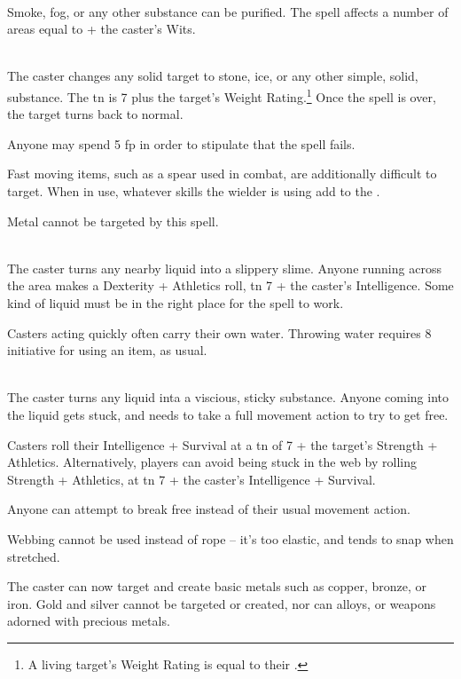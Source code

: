 \documentclass[titlepage,a4paper,openany]{book}
\begin{document}
\begin{multicols}{2}
\\
Smoke, fog, or any other substance can be purified.  The spell affects a number of areas equal to  + the caster's Wits.

\\
The caster changes any solid target to stone, ice, or any other simple, solid, substance.  The \gls{tn} is 7 plus the target's Weight Rating.\footnote{A living target's Weight Rating is equal to their .}  Once the spell is over, the target turns back to normal.

Anyone may spend 5 \gls{fp} in order to stipulate that the spell fails.

Fast moving items, such as a spear used in combat, are additionally difficult to target.  When in use, whatever skills the wielder is using add to the .

Metal cannot be targeted by this spell.

\\
The caster turns any nearby liquid into a slippery slime.  Anyone running across the area makes a Dexterity + Athletics roll, \gls{tn} 7 + the caster's Intelligence.  Some kind of liquid must be in the right place for the spell to work.

Casters acting quickly often carry their own water.  Throwing water requires 8 initiative for using an item, as usual.

\\
The caster turns any liquid inta a viscious, sticky substance.
Anyone coming into the liquid gets stuck, and needs to take a full movement action to try to get free.

Casters roll their Intelligence + Survival at a \gls{tn} of 7 + the target's Strength + Athletics. Alternatively, players can avoid being stuck in the web by rolling Strength + Athletics, at \gls{tn} 7 + the caster's Intelligence + Survival.

Anyone can attempt to break free instead of their usual movement action.

Webbing cannot be used instead of rope -- it's too elastic, and tends to snap when stretched.

 The caster can now target and create basic metals such as copper, bronze, or iron.  Gold and silver cannot be targeted or created, nor can alloys, or weapons adorned with precious metals.


\end{multicols}
\end{document}
